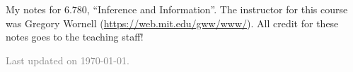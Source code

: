 \documentclass[11pt]{article}
\begin{document}
\maketitle

My notes for $6.780$, ``Inference and Information''. The instructor for this course was Gregory Wornell (\url{https://web.mit.edu/gww/www/}). All credit for these notes goes to the teaching staff! 

\vfill

\hfill \textcolor{gray}{\small Last updated on \today.}
\newpage
\tableofcontents 
\newpage
\importfiles %
\end{document}
